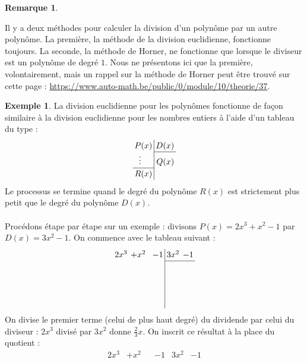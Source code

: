 \documentclass[a4paper,13pt]{scrreprt}
\theoremstyle{plain}
\theoremstyle{definition}
\newtheorem{exe}[subsection]{Exemple}
\newtheorem{rema}[subsection]{Remarque}
\begin{document}
\begin{rema}
\begin{itemize}
\begin{itemize}
		\end{itemize}
		Il y a deux méthodes pour calculer la division d'un polynôme par un autre polynôme. La première, la méthode de la division euclidienne, fonctionne toujours. La seconde, la méthode de Horner, ne fonctionne que lorsque le diviseur est un polynôme de degré $1$. Nous ne présentons ici que la première, volontairement, mais un rappel sur la méthode de Horner peut être trouvé sur cette page : \url{https://www.auto-math.be/public/0/module/10/theorie/37}.
\newpage
		\begin{exe}
			La division euclidienne pour les polynômes fonctionne de façon similaire à la division euclidienne pour les nombres entiers à l'aide d'un tableau du type :
			\begin{equation*}
			\renewcommand{\arraystretch}{1.2}
			\renewcommand{\arraycolsep}{2pt}
			\begin{array}{r|r}
			P(x) & D(x)  \\
			\cline{2-2}
			\vdots~~~~ & Q(x)\\
			\cline{1-1}
			R(x) &   
			\end{array}
			\end{equation*}
			Le processus se termine quand le degré du polynôme $R(x)$ est strictement plus petit que le degré du polynôme $D(x)$. \\
			~~\\
			Procédons étape par étape sur un exemple : divisons $P(x)=2x^3+x^2-1$ par $D(x)=3x^2-1$. On commence avec le tableau suivant :
			\begin{equation*}
			\renewcommand{\arraystretch}{1.2}
			\renewcommand{\arraycolsep}{2pt}
			\begin{array}{rrrr|rr}
			2x^3&+x^2 &   &-1&3x^2  &-1  \\
			\cline{5-6}
			   &    &   &  &   &   \\
			&  & &  &   &  \\
			&  &   &   &   &  \\
			&     &   &   &   &  
			\end{array}
			\end{equation*}
			On divise le premier terme (celui de plus haut degré) du dividende par celui du diviseur : $2x^3$ divisé par $3x^2$ donne $\frac{2}{3}x$. On inscrit ce résultat à la place du quotient :
			\begin{equation*}
			\renewcommand{\arraystretch}{1.2}
			\renewcommand{\arraycolsep}{2pt}
			\begin{array}{rrrr|rr}
			2x^3&+x^2 &   &-1&3x^2  &-1  \\

\end{array}
\end{equation*}
\end{exe}
\end{itemize}
\end{rema}
\end{document}
